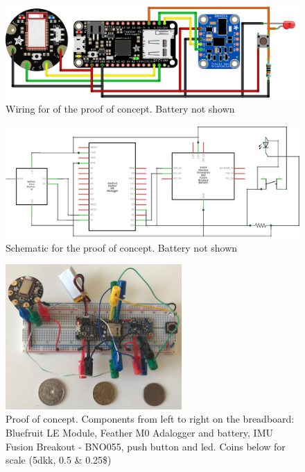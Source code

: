\begin{figure}[h!]
    \centering
    \includegraphics[width=1\textwidth]{figures/Sketch_bb.png}
    \caption{Wiring for of the proof of concept. Battery not shown}
    \label{sketch_bb}
\end{figure}

\begin{figure}[h!]
    \centering
    \includegraphics[width=1\textwidth]{figures/Sketch_schem.png}
    \caption{Schematic for the proof of concept. Battery not shown}
    \label{sketch_schem}
\end{figure}

\begin{figure}[h!]
    \centering
    \includegraphics[width=0.6\textwidth]{figures/poc.jpg}
    \caption{Proof of concept. Components from left to right on the breadboard: Bluefruit LE Module, Feather M0 Adalogger and battery, IMU Fusion Breakout - BNO055, push button and led. Coins below for scale (5dkk, 0.5\EURtm{} \& 0.25\$)}
    \label{poc}
\end{figure}


